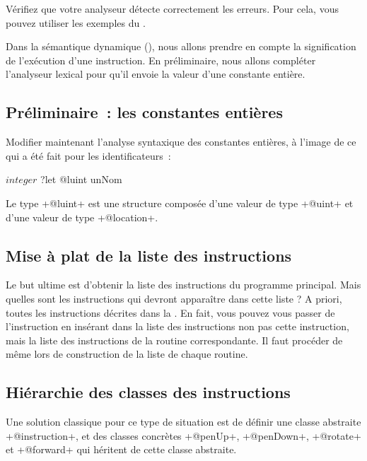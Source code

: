 Vérifiez que votre analyseur détecte correctement les erreurs. Pour cela, vous pouvez utiliser les exemples du .









Dans la sémantique dynamique (), nous allons prendre en compte la signification de l'exécution d'une instruction. En préliminaire, nous allons compléter l'analyseur lexical pour qu'il envoie la valeur d'une constante entière.

\subsection{Préliminaire~: les constantes entières}

Modifier maintenant l’analyse syntaxique des constantes entières, à l’image de ce qui a été fait pour les identificateurs~:
\begin{galgas3}
$integer$ ?let @luint unNom
\end{galgas3}

Le type \ggst+@luint+ est une structure composée d’une valeur de type \ggst+@uint+ et d’une valeur de type \ggst+@location+.

\subsection{Mise à plat de la liste des instructions}
Le but ultime est d'obtenir la liste des instructions du programme principal. Mais quelles sont les instructions qui devront apparaître dans cette liste ? A priori, toutes les instructions décrites dans la . En fait, vous pouvez vous passer de l'instruction  en insérant dans la liste des instructions non pas cette instruction, mais la liste des instructions de la routine correspondante. Il faut procéder de même lors de construction de la liste de chaque routine.

\subsection{Hiérarchie des classes des instructions}
Une solution classique pour ce type de situation est de définir une classe abstraite \ggst+@instruction+, et des classes concrètes \ggst+@penUp+, \ggst+@penDown+, \ggst+@rotate+ et \ggst+@forward+ qui héritent de cette classe abstraite.


